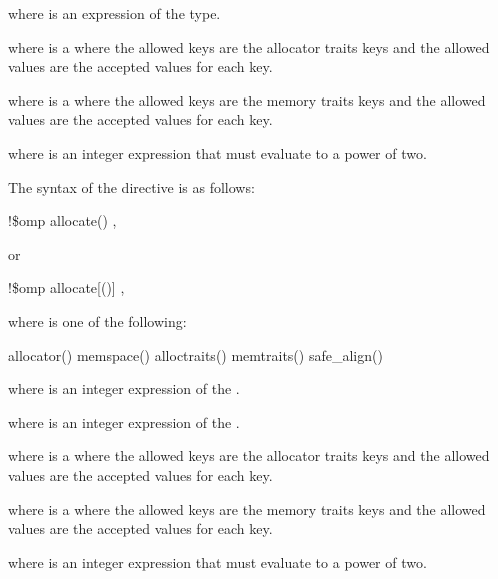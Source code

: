where  is an expression of the  type.

where  is a  where the allowed keys are the allocator traits keys and the allowed values are the accepted values for each key.

where  is a  where the allowed keys are the memory traits keys and the allowed values are the accepted values for each key.

where  is an integer expression that must evaluate to a power of two.

\ccppspecificend
\medskip

\fortranspecificstart
The syntax of the  directive is as follows:

\begin{boxedcode}
!\$omp allocate() \plc{[clause[ [ [},\plc{] clause] ... ]]}
\end{boxedcode}

or
\begin{boxedcode}
!\$omp allocate[()] \plc{clause[ [ [},\plc{] clause] ... ]}
\end{boxedcode}

where  is one of the following:

\begin{indentedcodelist}
allocator()
memspace()
alloctraits()
memtraits()
safe_align()
\end{indentedcodelist}

where  is an integer expression of the  .

where  is an integer expression of the  .

where  is a  where the allowed keys are the allocator traits keys and the allowed values are the accepted values for each key.

where  is a  where the allowed keys are the memory traits keys and the allowed values are the accepted values for each key.

where  is an integer expression that must evaluate to a power of two.

\fortranspecificend

\descr

